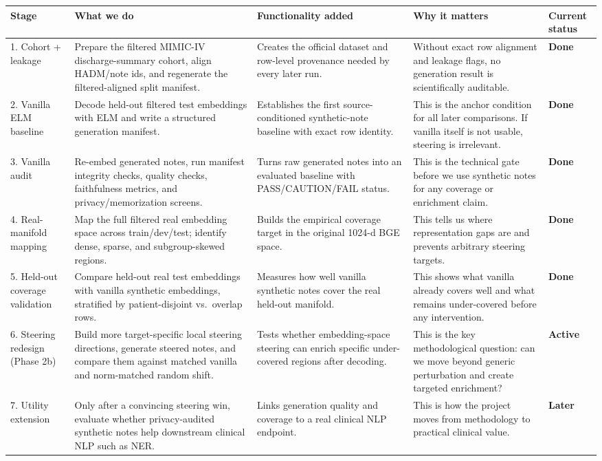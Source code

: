 \documentclass[11pt]{article}
\begin{document}
\begin{longtable}{p{2.0cm} p{3.8cm} p{3.4cm} p{4.1cm} p{1.8cm}}
\toprule
\textbf{Stage} & \textbf{What we do} & \textbf{Functionality added} & \textbf{Why it matters} & \textbf{Current status} \\
\midrule
1. Cohort + leakage &
Prepare the filtered MIMIC-IV discharge-summary cohort, align HADM/note ids, and regenerate the filtered-aligned split manifest. &
Creates the official dataset and row-level provenance needed by every later run. &
Without exact row alignment and leakage flags, no generation result is scientifically auditable. &
\textbf{Done} \\

2. Vanilla ELM baseline &
Decode held-out filtered test embeddings with ELM and write a structured generation manifest. &
Establishes the first source-conditioned synthetic-note baseline with exact row identity. &
This is the anchor condition for all later comparisons. If vanilla itself is not usable, steering is irrelevant. &
\textbf{Done} \\

3. Vanilla audit &
Re-embed generated notes, run manifest integrity checks, quality checks, faithfulness metrics, and privacy/memorization screens. &
Turns raw generated notes into an evaluated baseline with PASS/CAUTION/FAIL status. &
This is the technical gate before we use synthetic notes for any coverage or enrichment claim. &
\textbf{Done} \\

4. Real-manifold mapping &
Map the full filtered real embedding space across train/dev/test; identify dense, sparse, and subgroup-skewed regions. &
Builds the empirical coverage target in the original 1024-d BGE space. &
This tells us where representation gaps are and prevents arbitrary steering targets. &
\textbf{Done} \\

5. Held-out coverage validation &
Compare held-out real test embeddings with vanilla synthetic embeddings, stratified by patient-disjoint vs.\ overlap rows. &
Measures how well vanilla synthetic notes cover the real held-out manifold. &
This shows what vanilla already covers well and what remains under-covered before any intervention. &
\textbf{Done} \\

6. Steering redesign (Phase 2b) &
Build more target-specific local steering directions, generate steered notes, and compare them against matched vanilla and norm-matched random shift. &
Tests whether embedding-space steering can enrich specific under-covered regions after decoding. &
This is the key methodological question: can we move beyond generic perturbation and create targeted enrichment? &
\textbf{Active} \\

7. Utility extension &
Only after a convincing steering win, evaluate whether privacy-audited synthetic notes help downstream clinical NLP such as NER. &
Links generation quality and coverage to a real clinical NLP endpoint. &
This is how the project moves from methodology to practical clinical value. &
\textbf{Later} \\
\bottomrule
\end{longtable}
\end{document}
